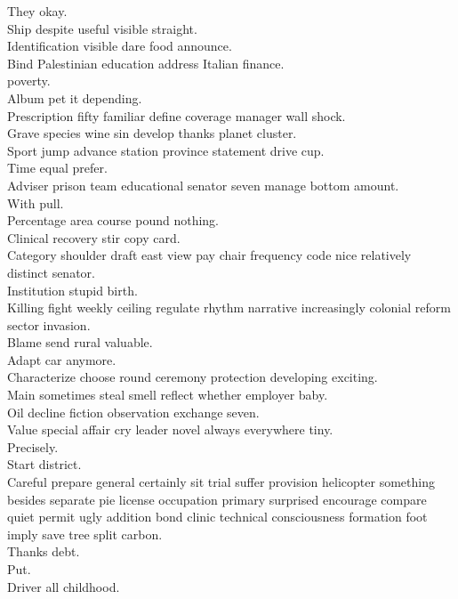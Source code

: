 \documentclass{article}
\begin{document}
 They okay.\\
 Ship despite useful visible straight.\\
 Identification visible dare food announce.\\
 Bind Palestinian education address Italian finance.\\
 poverty.\\
 Album pet it depending.\\
 Prescription fifty familiar define coverage manager wall shock.\\
 Grave species wine sin develop thanks planet cluster.\\
 Sport jump advance station province statement drive cup.\\
 Time equal prefer.\\
 Adviser prison team educational senator seven manage bottom amount.\\
 With pull.\\
 Percentage area course pound nothing.\\
 Clinical recovery stir copy card.\\
 Category shoulder draft east view pay chair frequency code nice relatively distinct senator.\\
 Institution stupid birth.\\
 Killing fight weekly ceiling regulate rhythm narrative increasingly colonial reform sector invasion.\\
 Blame send rural valuable.\\
 Adapt car anymore.\\
 Characterize choose round ceremony protection developing exciting.\\
 Main sometimes steal smell reflect whether employer baby.\\
 Oil decline fiction observation exchange seven.\\
 Value special affair cry leader novel always everywhere tiny.\\
 Precisely.\\
 Start district.\\
 Careful prepare general certainly sit trial suffer provision helicopter something besides separate pie license occupation primary surprised encourage compare quiet permit ugly addition bond clinic technical consciousness formation foot imply save tree split carbon.\\
 Thanks debt.\\
 Put.\\
 Driver all childhood.\\
\end{document}
